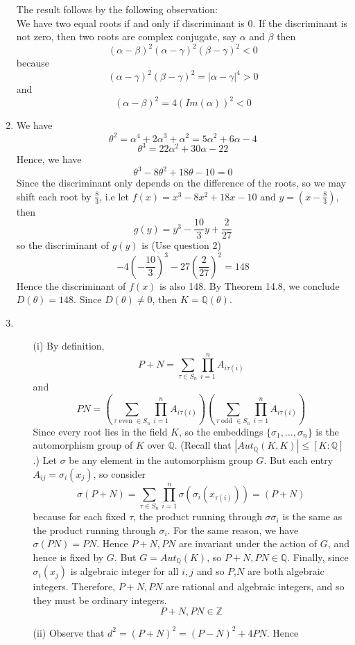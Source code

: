 \begin{enumerate}
    The result follows by the following observation:\\
    We have two equal roots if and only if discriminant is $0$. If the discriminant is not zero, then two roots
    are complex conjugate, say $\alpha$ and $\beta$ then
    $$(\alpha-\beta)^2(\alpha-\gamma)^2(\beta-\gamma)^2<0$$
    because $$(\alpha-\gamma)^2(\beta-\gamma)^2=|\alpha-\gamma|^4>0$$
    and
    $$(\alpha-\beta)^2=4(Im(\alpha))^2<0$$
\item We have
    $$\theta^2=\alpha^4+2\alpha^3+\alpha^2=5\alpha^2+6\alpha-4$$
    $$\theta^3=22\alpha^2+30\alpha-22$$
    Hence, we have
    $$\theta^3-8\theta^2+18\theta-10=0$$
    Since the discriminant only depends on the difference of the roots, so we may shift each root by
    $\frac{8}{3}$, i.e
    let $f(x)=x^3-8x^2+18x-10$ and $y=(x-\frac{8}{3})$, then
    $$g(y)=y^3-\frac{10}{3}y+\frac{2}{27}$$
    so the discriminant of $g(y)$ is (Use question 2)
    $$-4\left(-\frac{10}{3}\right)^3-27\left(\frac{2}{27}\right)^2=148$$
    Hence the discriminant of $f(x)$ is also 148. By Theorem 14.8, we conclude $D(\theta)=148$.
    Since $D(\theta) \neq 0$, then $K=\mathbb{Q}(\theta)$.
\item \begin{enumerate}
    \item[(i)] By definition,
    $$P+N=\sum_{\tau \in S_n}\prod_{i=1}^n A_{i \tau(i)}$$
    and
    $$PN=\left(\sum_{\tau \text{ even }\in S_n}\prod_{i=1}^n A_{i \tau(i)}\right)
    \left(\sum_{\tau \text{ odd }\in S_n}\prod_{i=1}^n A_{i \tau(i)}\right)$$
    Since every root lies in the field $K$, so the embeddings $\{\sigma_1,\ldots,\sigma_n\}$ is the
    automorphism group of $K$ over $\mathbb{Q}$. (Recall that $|Aut_\mathbb{Q}(K,K)| \le [K:\mathbb{Q}]$.)
    Let $\sigma$ be any element in the automorphism group $G$. But each entry $A_{ij}=\sigma_i(x_j)$, so
    consider
    $$\sigma(P+N)=\sum_{\tau \in S_n}\prod_{i=1}^n \sigma(\sigma_i(x_{\tau(i)}))=(P+N)$$
    because for each fixed $\tau$, the product running through $\sigma\sigma_i$ is the same as the product
    running through $\sigma_i$.
    For the same reason, we have $\sigma(PN)=PN$. Hence $P+N,PN$ are invariant under the action of $G$, and
    hence is fixed by $G$. But $G=Aut_\mathbb{Q}(K)$, so $P+N,PN \in \mathbb{Q}$. Finally, since
    $\sigma_i(x_j)$ is algebraic integer for all $i,j$ and so $P$,$N$ are both algebraic integers. Therefore,
    $P+N,PN$ are rational and algebraic integers, and so they must be ordinary integers.
    $$P+N,PN \in \mathbb{Z}$$
    \item[(ii)] Observe that $d^2=(P+N)^2=(P-N)^2+4PN$. Hence

\end{enumerate}
\end{enumerate}
